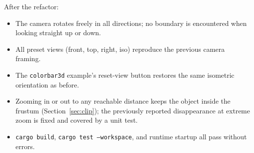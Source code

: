 \documentclass[11pt]{article}
\begin{document}
After the refactor:
\begin{itemize}
  \item The camera rotates freely in all directions; no boundary is
        encountered when looking straight up or down.
  \item All preset views (front, top, right, iso) reproduce the
        previous camera framing.
  \item The \texttt{colorbar3d} example's reset-view button restores
        the same isometric orientation as before.
  \item Zooming in or out to any reachable distance keeps the object
        inside the frustum (Section~\ref{sec:clip}); the previously
        reported disappearance at extreme zoom is fixed and covered by
        a unit test.
  \item \texttt{cargo build}, \texttt{cargo test --workspace}, and
        runtime startup all pass without errors.
\end{itemize}
\end{document}
